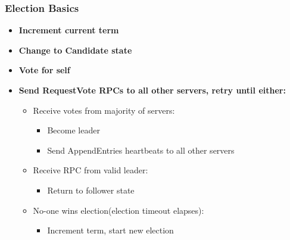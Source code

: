 \begin{frame}
    \frametitle{Election Basics}
    \begin{itemize}
        \item \textbf{Increment current term}
        \item \textbf{Change to Candidate state}
    \item \textbf{Vote for self}
    \item \textbf{Send RequestVote RPCs to all other servers, retry until either:}
            \begin{itemize}
                \item Receive votes from majority of servers:
                    \begin{itemize}
                        \item Become leader
                        \item Send AppendEntries heartbeats to all other servers
                    \end{itemize}
                \item Receive RPC from valid leader:
                    \begin{itemize}
                        \item Return to follower state
                    \end{itemize}
                \item No-one wins election(election timeout elapses):
                    \begin{itemize}
                        \item Increment term, start new election
                    \end{itemize}
            \end{itemize}
    \end{itemize}
\end{frame}

